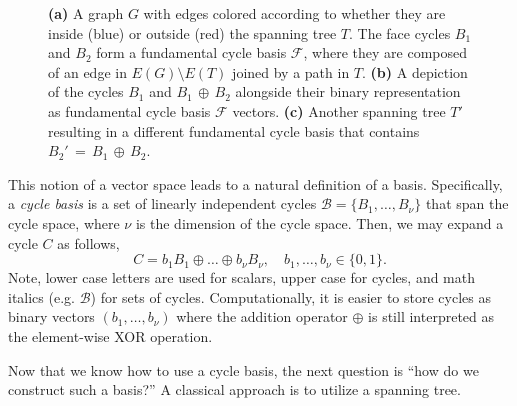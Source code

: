 \documentclass[fleqn,11pt]{article}
\newcommand\calB{\mathcal{B}}
\newcommand\calF{\mathcal{F}}
\begin{document}
\begin{figure}[t]
%	
	\caption{\textbf{(a)} A graph $G$ with edges colored according to whether they are inside (blue) or outside (red) the spanning tree $T$. 
		The face cycles $B_1$ and $B_2$ form a fundamental cycle basis $\calF$, where they are composed of an edge in $E(G){\setminus} E(T)$ joined by a path in $T$.
		\textbf{(b)} A depiction of the cycles $B_1$ and $B_1\,{\oplus}\, B_2$ alongside their binary representation as fundamental cycle basis $\calF$ vectors. \textbf{(c)} Another spanning tree $T'$ resulting in a different fundamental cycle basis that contains $B_2'\,{=}\,B_1\,{\oplus}\, B_2$.}
	\label{fig:FCB}
\end{figure}



This notion of a vector space leads to a natural definition of a basis. Specifically, a \textit{cycle basis} is a set of linearly independent cycles $\calB=\{B_1,\hdots,B_\nu\}$ that span the cycle space, where $\nu$ is the dimension of the cycle space. Then, we may expand a cycle $C$ as follows,
\begin{equation}
	C = b_1 B_1\oplus\hdots\oplus b_\nu B_\nu,\quad b_1,\hdots,b_\nu\in\{0,1\}.
	\label{eq:cyc_exp_format_full}
\end{equation}
Note, lower case letters are used for scalars, upper case for cycles, and math italics (e.g. $\calB$) for sets of cycles. Computationally, it is easier to store cycles as binary vectors $(b_1,\hdots,b_\nu)$ where the addition operator $\oplus$ is still interpreted as the element-wise XOR operation. 




Now that we know how to use a cycle basis, the next question is ``how do we construct such a basis?''
A classical approach is to utilize a spanning tree.
\end{document}
